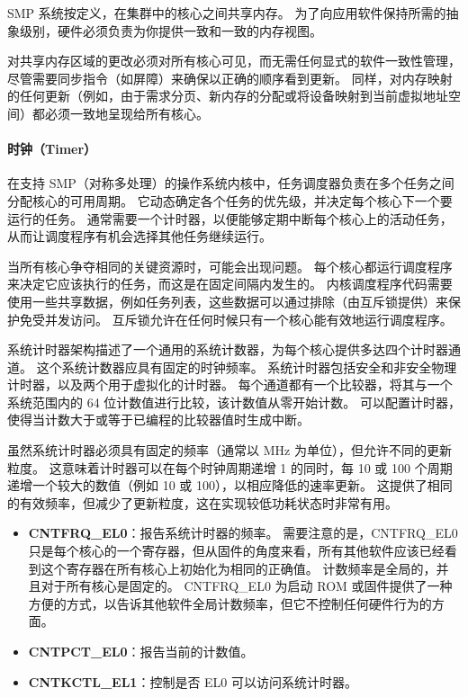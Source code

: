SMP 系统按定义，在集群中的核心之间共享内存。
为了向应用软件保持所需的抽象级别，硬件必须负责为你提供一致和一致的内存视图。

对共享内存区域的更改必须对所有核心可见，而无需任何显式的软件一致性管理，尽管需要同步指令（如屏障）来确保以正确的顺序看到更新。
同样，对内存映射的任何更新（例如，由于需求分页、新内存的分配或将设备映射到当前虚拟地址空间）都必须一致地呈现给所有核心。

\paragraph{时钟（Timer）}

在支持 SMP（对称多处理）的操作系统内核中，任务调度器负责在多个任务之间分配核心的可用周期。
它动态确定各个任务的优先级，并决定每个核心下一个要运行的任务。
通常需要一个计时器，以便能够定期中断每个核心上的活动任务，从而让调度程序有机会选择其他任务继续运行。

当所有核心争夺相同的关键资源时，可能会出现问题。
每个核心都运行调度程序来决定它应该执行的任务，而这是在固定间隔内发生的。
内核调度程序代码需要使用一些共享数据，例如任务列表，这些数据可以通过排除（由互斥锁提供）来保护免受并发访问。
互斥锁允许在任何时候只有一个核心能有效地运行调度程序。


系统计时器架构描述了一个通用的系统计数器，为每个核心提供多达四个计时器通道。
这个系统计数器应具有固定的时钟频率。
系统计时器包括安全和非安全物理计时器，以及两个用于虚拟化的计时器。
每个通道都有一个比较器，将其与一个系统范围内的 64 位计数值进行比较，该计数值从零开始计数。
可以配置计时器，使得当计数大于或等于已编程的比较器值时生成中断。

虽然系统计时器必须具有固定的频率（通常以 MHz 为单位），但允许不同的更新粒度。
这意味着计时器可以在每个时钟周期递增 1 的同时，每 10 或 100 个周期递增一个较大的数值（例如 10 或 100），以相应降低的速率更新。
这提供了相同的有效频率，但减少了更新粒度，这在实现较低功耗状态时非常有用。


\begin{itemize}
  \item
    \textbf{CNTFRQ\_EL0}：报告系统计时器的频率。
    需要注意的是，CNTFRQ\_EL0 只是每个核心的一个寄存器，但从固件的角度来看，所有其他软件应该已经看到这个寄存器在所有核心上初始化为相同的正确值。
    计数频率是全局的，并且对于所有核心是固定的。
    CNTFRQ\_EL0 为启动 ROM 或固件提供了一种方便的方式，以告诉其他软件全局计数频率，但它不控制任何硬件行为的方面。
  \item
    \textbf{CNTPCT\_EL0}：报告当前的计数值。
  \item
    \textbf{CNTKCTL\_EL1}：控制是否 EL0 可以访问系统计时器。
\end{itemize}


